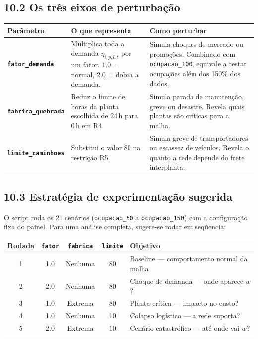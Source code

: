 \documentclass[12pt, a4paper]{article}
\begin{document}
\subsection*{10.2 Os tr\^{e}s eixos de perturba\c{c}\~{a}o}

\begin{center}
\renewcommand{\arraystretch}{1.5}
\begin{tabular}{>{\bfseries\color{ballblue}}p{3.5cm} p{5cm} p{5cm}}
  \toprule
  Par\^{a}metro & O que representa & Como perturbar \\
  \midrule
  \texttt{fator\_demanda} &
    Multiplica toda a demanda $\eta_{i,p,l,t}$ por um fator. \newline
    $1.0$ = normal, $2.0$ = dobra a demanda. &
    Simula choques de mercado ou promo\c{c}\~{o}es. Combinado com \texttt{ocupacao\_100},
    equivale a testar ocupa\c{c}\~{o}es al\'{e}m dos 150\% dos dados. \\[4pt]
  \texttt{fabrica\_quebrada} &
    Reduz o limite de horas da planta escolhida de 24\,h para 0\,h em R4. &
    Simula parada de manuten\c{c}\~{a}o, greve ou desastre. Revela quais plantas
    s\~{a}o cr\'{i}ticas para a malha. \\[4pt]
  \texttt{limite\_caminhoes} &
    Substitui o valor 80 na restri\c{c}\~{a}o R5. &
    Simula greve de transportadores ou escassez de ve\'{i}culos.
    Revela o quanto a rede depende do frete interplanta. \\
  \bottomrule
\end{tabular}
\end{center}

\subsection*{10.3 Estrat\'{e}gia de experimenta\c{c}\~{a}o sugerida}

O script roda os 21 cen\'{a}rios (\texttt{ocupacao\_50} a \texttt{ocupacao\_150}) com a
configura\c{c}\~{a}o fixa do painel. Para uma an\'{a}lise completa, sugere-se rodar em seq\^{u}encia:

\begin{center}
\renewcommand{\arraystretch}{1.4}
\begin{tabular}{c c c c p{5.5cm}}
  \toprule
  Rodada & \texttt{fator} & \texttt{fabrica} & \texttt{limite} & Objetivo \\
  \midrule
  1 & 1.0 & Nenhuma & 80 & Baseline --- comportamento normal da malha \\
  2 & 2.0 & Nenhuma & 80 & Choque de demanda --- onde aparece $w$? \\
  3 & 1.0 & Extrema & 80 & Planta cr\'{i}tica --- impacto no custo? \\
  4 & 1.0 & Nenhuma & 10 & Colapso log\'{i}stico --- a rede suporta? \\
  5 & 2.0 & Extrema & 10 & Cen\'{a}rio catastrófico --- at\'{e} onde vai $w$? \\
  \bottomrule
\end{tabular}
\end{center}
\end{document}

